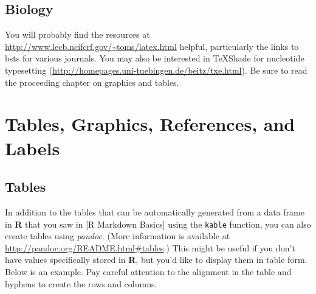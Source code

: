 \documentclass[12pt,twoside]{reedthesis}
\theoremstyle{definition}
\theoremstyle{definition}
\theoremstyle{remark}
\begin{document}
  \section{Biology}\label{biology}
  
  You will probably find the resources at
  \url{http://www.lecb.ncifcrf.gov/~toms/latex.html} helpful, particularly
  the links to bsts for various journals. You may also be interested in
  TeXShade for nucleotide typesetting
  (\url{http://homepages.uni-tuebingen.de/beitz/txe.html}). Be sure to
  read the proceeding chapter on graphics and tables.
  
  \chapter{Tables, Graphics, References, and Labels}\label{ref-labels}
  
  \section{Tables}\label{tables}
  
  In addition to the tables that can be automatically generated from a
  data frame in \textbf{R} that you saw in {[}R Markdown Basics{]} using
  the \texttt{kable} function, you can also create tables using
  \emph{pandoc}. (More information is available at
  \url{http://pandoc.org/README.html\#tables}.) This might be useful if
  you don't have values specifically stored in \textbf{R}, but you'd like
  to display them in table form. Below is an example. Pay careful
  attention to the alignment in the table and hyphens to create the rows
  and columns.
  
\end{document}
